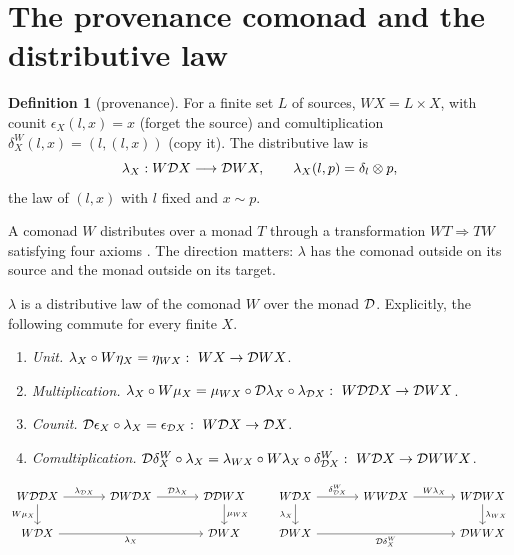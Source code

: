 \documentclass[11pt]{article}
\theoremstyle{definition}\newtheorem{definition}[theorem]{Definition}\newtheorem{remark}[theorem]{Remark}\newtheorem{example}[theorem]{Example}
\begin{document}
\section{The provenance comonad and the distributive law}\label{sec:comonad}
\begin{definition}[provenance]\label{def:context}
For a finite set $L$ of sources, $WX=L\times X$, with counit $\epsilon_X(l,x)=x$ (forget the source) and comultiplication
$\delta^W_X(l,x)=(l,(l,x))$ (copy it). The distributive law is
\[
\lambda_X:W\mathcal D X\longrightarrow\mathcal D WX,\qquad\lambda_X(l,p)=\delta_l\otimes p ,
\]
the law of $(l,x)$ with $l$ fixed and $x\sim p$.
\end{definition}

A comonad $W$ distributes over a monad $T$ through a transformation $WT\Rightarrow TW$ satisfying four axioms
\cite{PowerWatanabe2002}. The direction matters: $\lambda$ has the comonad outside on its source and the monad outside on its target.

\begin{proposition}\label{prop:dist}
$\lambda$ is a distributive law of the comonad $W$ over the monad $\mathcal D$. Explicitly, the following commute for every finite $X$.
\begin{enumerate}
\item[(1)] \emph{Unit.} $\lambda_X\circ W\eta_X=\eta_{WX}:\ WX\to\mathcal D WX$.
\item[(2)] \emph{Multiplication.} $\lambda_X\circ W\mu_X=\mu_{WX}\circ\mathcal D\lambda_X\circ\lambda_{\mathcal D X}:\ W\mathcal D\mathcal D X\to\mathcal D WX$.
\item[(3)] \emph{Counit.} $\mathcal D\epsilon_X\circ\lambda_X=\epsilon_{\mathcal D X}:\ W\mathcal D X\to\mathcal D X$.
\item[(4)] \emph{Comultiplication.} $\mathcal D\delta^W_X\circ\lambda_X=\lambda_{WX}\circ W\lambda_X\circ\delta^W_{\mathcal D X}:\ W\mathcal D X\to\mathcal D WWX$.
\end{enumerate}
\[
\begin{tikzcd}[column sep=large]
W\D\D X \arrow[r,"\lambda_{\D X}"] \arrow[d,"W\mu_X"'] & \D W\D X \arrow[r,"\D\lambda_X"] & \D\D WX \arrow[d,"\mu_{WX}"] \\
W\D X \arrow[rr,"\lambda_X"'] & & \D WX
\end{tikzcd}
\qquad
\begin{tikzcd}[column sep=large]
W\D X \arrow[r,"\delta^W_{\D X}"] \arrow[d,"\lambda_X"'] & WW\D X \arrow[r,"W\lambda_X"] & W\D WX \arrow[d,"\lambda_{WX}"] \\
\D WX \arrow[rr,"\D\delta^W_X"'] & & \D WWX
\end{tikzcd}
\]
\end{proposition}
\end{document}
